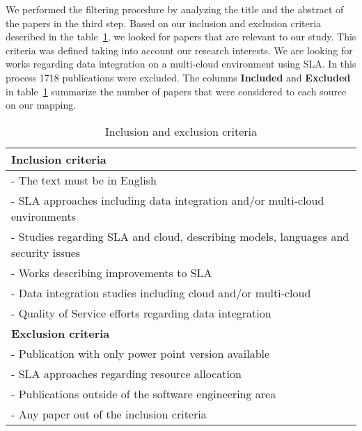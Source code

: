 
We performed the filtering procedure by analyzing the title and the abstract of the papers in the
third step. 
Based on our inclusion and exclusion criteria described in the table~\ref{table:criteria}, we looked for 
papers that are relevant to our study. 
This criteria was defined taking into account our research interests. 
We are looking for works regarding data integration on a multi-cloud environment using SLA.
In this process 1718 publications were excluded. 
The columns \textbf{Included} and \textbf{Excluded} in table~\ref{table:criteria} summarize the number of papers that were considered to each source on our mapping.

\begin{table}[!htb]
\begin{center}
\begin{tabular}{p{10cm}}
\bottomrule \hline
\textbf{Inclusion criteria} \\ 
\hline 
- The text must be in English \\ 
- SLA approaches including data integration and/or multi-cloud environments\\
- Studies regarding SLA and cloud, describing models, languages and security issues \\
- Works describing improvements to SLA \\
- Data integration studies including cloud and/or multi-cloud  \\
- Quality of Service efforts regarding data integration \\
\bottomrule \hline 
\textbf{Exclusion criteria} \\ 
\hline 
- Publication with only power point version available \\ 
- SLA approaches regarding resource allocation \\
- Publications outside of the software engineering area \\
- Any paper out of the inclusion criteria  \\
\bottomrule \hline
\end{tabular} 
\end{center}
\caption{Inclusion and exclusion criteria}\label{table:criteria}
\end{table}

